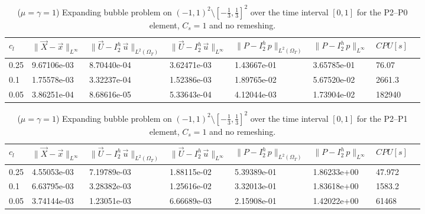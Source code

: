 \documentclass[a4paper,12pt,onecolumn]{article}
\newcommand{\errorXx}{\|\vec{X} - \vec{x}\|_{L^\infty}}
\newcommand{\LerrorUu}[1]{\|\vec U - I^h_{#1}\,\vec u\|_{L^2(\Omega_T)}}
\newcommand{\errorUu}[1]{\|\vec U - I^h_{#1}\,\vec u\|_{L^\infty}}
\newcommand{\errorPp}[1]{\|P - I^h_{#1}\,p\|_{L^\infty}}
\newcommand{\LerrorPp}[1]{\|P - I^h_{#1}\,p\|_{L^2(\Omega_T)}}
\begin{document}
\begin{table}
 \center
 \hspace*{-2cm}
\begin{tabular}{llllllll}
\hline
$c_l$ & $\errorXx$ & $\LerrorUu2$ & $\errorUu2$ & $\LerrorPp2$ & $\errorPp2$ & $CPU[s]$\\
\hline
0.25 & 9.67106e-03 & 8.70440e-04 & 3.62471e-03 & 1.43667e-01 & 3.65785e-01 & 76.07\\
0.1 & 1.75578e-03 & 3.32237e-04 & 1.52386e-03 & 1.89765e-02 & 5.67520e-02 & 2661.3\\
0.05 & 3.86251e-04 & 8.68616e-05 & 5.33643e-04 & 4.12044e-03 & 1.73904e-02 & 182940\\ 
\hline
\end{tabular}
\hspace*{-2cm}
\caption{($\mu=\gamma=1$) Expanding bubble problem on $(-1,1)^2\setminus[-\frac{1}{3},\frac{1}{3}]^2$ over the time interval $[0,1]$ for the P2--P0 element, $C_s=1$ and no remeshing.}
\label{tab:expandingbubble2Dp2p0smooth}
\end{table}

\begin{table}
 \center
 \hspace*{-2cm}
\begin{tabular}{llllllll}
\hline
$c_l$ & $\errorXx$ & $\LerrorUu2$ & $\errorUu2$ & $\LerrorPp2$ & $\errorPp2$ & $CPU[s]$ \\
\hline
0.25 & 4.55053e-03 & 7.19789e-03 & 1.88115e-02 & 5.39389e-01 & 1.86233e+00 & 47.972\\
0.1 & 6.63795e-03 & 3.28382e-03 & 1.25616e-02 & 3.32013e-01 & 1.83618e+00 & 1583.2\\
0.05 & 3.74144e-03 & 1.23051e-03 & 6.66689e-03 & 2.15908e-01 & 1.42022e+00 & 61468\\
\hline
\end{tabular}
\hspace*{-2cm}
\caption{($\mu=\gamma=1$) Expanding bubble problem on $(-1,1)^2\setminus[-\frac{1}{3},\frac{1}{3}]^2$ over the time interval $[0,1]$ for the P2--P1 element, $C_s=1$ and no remeshing.}
\label{tab:expandingbubble2Dp2p1smooth}
\end{table}
\end{document}
